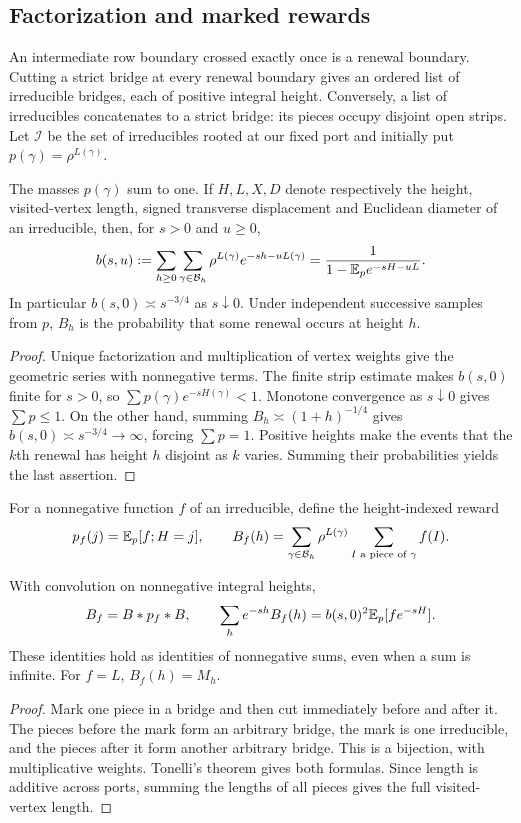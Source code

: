 \subsection{Factorization and marked rewards}
An intermediate row boundary crossed exactly once is a renewal boundary. Cutting a strict bridge at every renewal boundary gives an ordered list of irreducible bridges, each of positive integral height. Conversely, a list of irreducibles concatenates to a strict bridge: its pieces occupy disjoint open strips. Let $\mathcal I$ be the set of irreducibles rooted at our fixed port and initially put $p(\gamma)=\rho^{L(\gamma)}$.

\begin{proposition}\label{R:renew:factorization}
The masses $p(\gamma)$ sum to one. If $H,L,X,D$ denote respectively the height, visited-vertex length, signed transverse displacement and Euclidean diameter of an irreducible, then, for $s>0$ and $u\ge0$,
\[
 b(s,u):=\sum_{h\ge0}\sum_{\gamma\in\mathcal B_h}
       \rho^{L(\gamma)}e^{-sh-uL(\gamma)}
 =\frac1{1-\mathbb E_p e^{-sH-uL}}.
\]
In particular $b(s,0)\asymp s^{-3/4}$ as $s\downarrow0$. Under independent successive samples from $p$, $B_h$ is the probability that some renewal occurs at height $h$.
\end{proposition}
\begin{proof}
Unique factorization and multiplication of vertex weights give the geometric series with nonnegative terms. The finite strip estimate makes $b(s,0)$ finite for $s>0$, so $\sum p(\gamma)e^{-sH(\gamma)}<1$. Monotone convergence as $s\downarrow0$ gives $\sum p\le1$. On the other hand, summing $B_h\asymp(1+h)^{-1/4}$ gives $b(s,0)\asymp s^{-3/4}\to\infty$, forcing $\sum p=1$. Positive heights make the events that the $k$th renewal has height $h$ disjoint as $k$ varies. Summing their probabilities yields the last assertion.
\end{proof}

For a nonnegative function $f$ of an irreducible, define the height-indexed reward
\[
 p_f(j)=\mathbb E_p[f;H=j],\qquad
 B_f(h)=\sum_{\gamma\in\mathcal B_h}\rho^{L(\gamma)}
                 \sum_{I\text{ a piece of }\gamma} f(I).
\]
\begin{lemma}\label{R:renew:reward}
With convolution on nonnegative integral heights,
\[
 B_f=B*p_f*B,\qquad
 \sum_h e^{-sh}B_f(h)=b(s,0)^2\mathbb E_p[fe^{-sH}].
\]
These identities hold as identities of nonnegative sums, even when a sum is infinite. For $f=L$, $B_f(h)=M_h$.
\end{lemma}
\begin{proof}
Mark one piece in a bridge and then cut immediately before and after it. The pieces before the mark form an arbitrary bridge, the mark is one irreducible, and the pieces after it form another arbitrary bridge. This is a bijection, with multiplicative weights. Tonelli's theorem gives both formulas. Since length is additive across ports, summing the lengths of all pieces gives the full visited-vertex length.
\end{proof}


